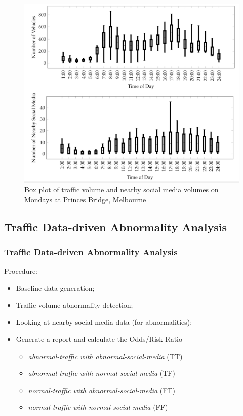 \begin{frame}
    \frametitle{}
    \begin{figure}
    	\centering
    	\includegraphics[width=0.7\columnwidth]{resource/figures/box_plot.png}
    	\caption{Box plot of traffic volume and nearby social media volumes on Mondays at Princes Bridge, Melbourne}
    \end{figure}
\end{frame}


\subsection{Traffic Data-driven Abnormality Analysis}
\begin{frame}
    \frametitle{Traffic Data-driven Abnormality Analysis}
    Procedure:
    \begin{itemize}
	    \item Baseline data generation;
	    \item Traffic volume abnormality detection;
	    \item Looking at nearby social media data (for abnormalities);
	    \item Generate a report and calculate the Odds/Risk Ratio \cite{lipsitz1991generalized}
	    \begin{itemize} \small 
	        \item {\it abnormal-traffic with abnormal-social-media} (TT)
	        \item {\it abnormal-traffic with normal-social-media} (TF)
	        \item {\it normal-traffic with abnormal-social-media} (FT)
	        \item {\it normal-traffic with normal-social-media} (FF)
	    \end{itemize}
    \end{itemize}
\end{frame}

